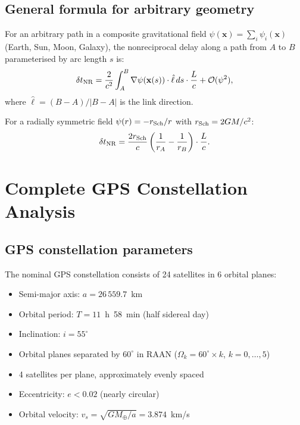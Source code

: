 \documentclass[aps,prl,twocolumn,superscriptaddress,showpacs]{revtex4-2}
\newcommand{\Order}{\mathcal{O}}
\newcommand{\Mearth}{M_\oplus}
\newcommand{\rSch}{r_{\rm Sch}}
\begin{document}
\subsection{General formula for arbitrary geometry}

For an arbitrary path in a composite gravitational field
$\psi(\mathbf{x}) = \sum_i \psi_i(\mathbf{x})$ (Earth, Sun,
Moon, Galaxy), the nonreciprocal delay along a path from
$A$ to $B$ parameterised by arc length $s$ is:
\begin{equation}
\delta t_{\rm NR} = \frac{2}{c^2}\int_A^B
\nabla\psi(\mathbf{x}(s))\cdot\hat{\ell}\,ds\cdot\frac{L}{c}
+ \Order(\psi^2),
\label{eq:NR_general}
\end{equation}
where $\hat{\ell} = (B-A)/|B-A|$ is the link direction.

For a radially symmetric field $\psi(r) = -\rSch/r$ with
$\rSch = 2GM/c^2$:
\begin{equation}
\delta t_{\rm NR} = \frac{2\rSch}{c}\left(\frac{1}{r_A} - \frac{1}{r_B}\right)\cdot\frac{L}{c}.
\label{eq:NR_radial}
\end{equation}

\section{Complete GPS Constellation Analysis}\label{sec:gps}

\subsection{GPS constellation parameters}

The nominal GPS constellation consists of 24 satellites in 6
orbital planes:
\begin{itemize}
\item Semi-major axis: $a = 26\,559.7$~km
\item Orbital period: $T = 11$~h~58~min (half sidereal day)
\item Inclination: $i = 55^\circ$
\item Orbital planes separated by $60^\circ$ in RAAN
      ($\Omega_k = 60^\circ \times k$, $k = 0,\ldots,5$)
\item 4 satellites per plane, approximately evenly spaced
\item Eccentricity: $e < 0.02$ (nearly circular)
\item Orbital velocity: $v_s = \sqrt{G\Mearth/a} = 3.874$~km/s
\end{itemize}
\end{document}

